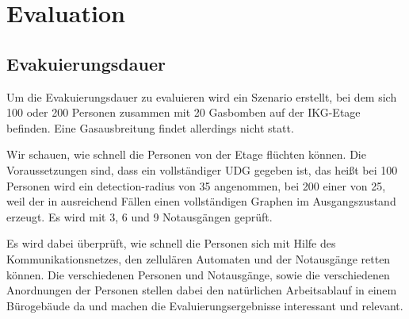 \chapter{Evaluation}
\label{cha:evaluation}



\section{Evakuierungsdauer}
Um die Evakuierungsdauer zu evaluieren wird ein Szenario erstellt, bei dem sich 100 oder 200 Personen zusammen mit 20 Gasbomben auf der IKG-Etage befinden. Eine Gasausbreitung findet allerdings nicht statt. 

Wir schauen, wie schnell die Personen von der Etage flüchten können. Die Voraussetzungen sind, dass ein vollständiger UDG gegeben ist, das heißt bei 100 Personen wird ein detection-radius von 35 angenommen, bei 200 einer von 25, weil der in ausreichend Fällen einen vollständigen Graphen im Ausgangszustand erzeugt. Es wird mit 3, 6 und 9 Notausgängen geprüft. 

Es wird dabei überprüft, wie schnell die Personen sich mit Hilfe des Kommunikationsnetzes, den zellulären Automaten und der Notausgänge retten können. Die verschiedenen Personen und Notausgänge, sowie die verschiedenen Anordnungen der Personen stellen dabei den natürlichen Arbeitsablauf in einem Bürogebäude da und machen die Evaluierungsergebnisse interessant und relevant.

